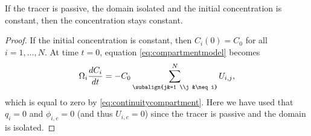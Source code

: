 \begin{property} \label{prop2_comp}
	If the tracer is passive, the domain isolated and the initial concentration is constant, then the concentration stays constant.
\end{property}
\begin{proof}
	If the initial concentration is constant, then $C_i(0) = C_0$ for all $i = 1,\dots,N$. At time $t=0$, equation \eqref{eq:compartmentmodel} becomes
	\begin{equation}
		\Omega_i \frac{dC_i}{dt} = -C_0 \sum_{\subalign{j&=1 \\j &\neq i}}^N U_{i,j},
	\end{equation}
	which is equal to zero by \eqref{eq:continuitycompartment}. Here we have used that $q_i = 0$ and $\phi_{i,e} = 0$ (and thus $U_{i,e}=0$) since the tracer is passive and the domain is isolated.
\end{proof}

